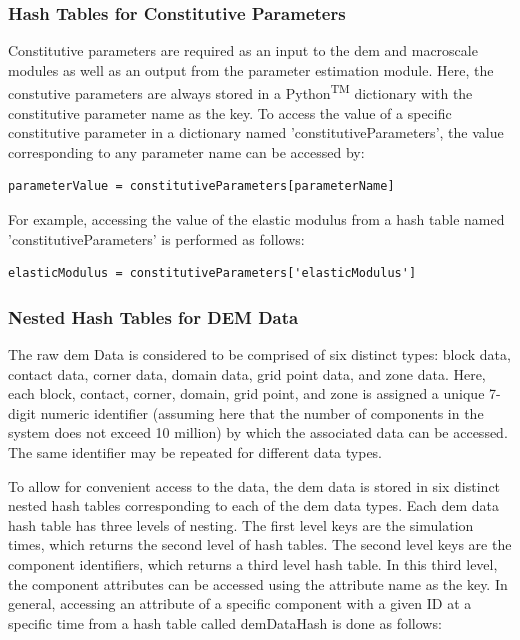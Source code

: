 \subsubsection*{Hash Tables for Constitutive Parameters}

Constitutive parameters are required as an input to the \acrshort{dem} and macroscale modules as well as an output from the parameter estimation module. Here, the constutive parameters are always stored in a Python\textsuperscript{TM} dictionary with the constitutive parameter name as the key. To access the value of a specific constitutive parameter in a dictionary named 'constitutiveParameters', the value corresponding to any parameter name can be accessed by:

\begin{lstlisting}[frame=single]
parameterValue = constitutiveParameters[parameterName]
\end{lstlisting}

For example, accessing the value of the elastic modulus from a hash table named 'constitutiveParameters' is performed as follows:

\begin{lstlisting}[frame=single]
elasticModulus = constitutiveParameters['elasticModulus']
\end{lstlisting}

\subsubsection*{Nested Hash Tables for DEM Data}
The raw \acrshort{dem} Data is considered to be comprised of six distinct types: block data, contact data, corner data, domain data, grid point data, and zone data. Here, each block, contact, corner, domain, grid point, and zone is assigned a unique 7-digit numeric identifier (assuming here that the number of components in the system does not exceed 10 million) by which the associated data can be accessed. The same identifier may be repeated for different data types.

To allow for convenient access to the data, the \acrshort{dem} data is stored in six distinct nested hash tables corresponding to each of the \acrshort{dem} data types.  Each \acrshort{dem} data hash table has three levels of nesting. The first level keys are the simulation times, which returns the second level of hash tables. The second level keys are the component identifiers, which returns a third level hash table. In this third level, the component attributes can be accessed using the attribute name as the key. In general, accessing an attribute of a specific component with a given ID at a specific time from a hash table called demDataHash is done as follows:


